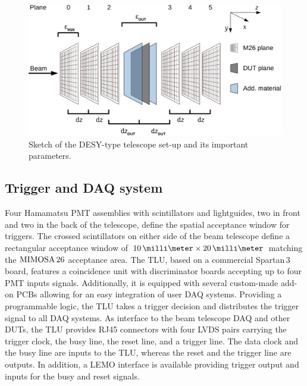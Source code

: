 \begin{figure}[tb]
	\center
	\includegraphics[width=.9\textwidth]{figures/sketch_tscope4}
	\caption[Sketch of the DESY-type telescope set-up]{Sketch of the DESY-type telescope set-up and its important parameters.}
	\label{fig:datura_sketch}
\end{figure}

\subsection{Trigger and DAQ system}

Four Hamamatsu PMT assemblies with scintillators and lightguides, two in front and two in the back of the telescope, define the spatial acceptance window for triggers. 
The crossed scintillators on either side of the beam telescope define a rectangular acceptance window of $10\,\milli\meter \times 20\,\milli\meter$ matching the $\textrm{MIMOSA\,26}$ acceptance area. 
The TLU, based on a commercial Spartan\,3 board, features a coincidence unit with discriminator boards accepting up to four PMT inputs signals. 
Additionally, it is equipped with several custom-made add-on PCBs allowing for an easy integration of user DAQ systems. 
Providing a programmable logic, the TLU  takes a trigger decision and distributes the trigger signal to all DAQ systems.
As interface to the beam telescope DAQ and other DUTs, the TLU provides RJ45 connectors with four LVDS pairs carrying the trigger clock, the busy line, the reset line, and a trigger line. 
The data clock and the busy line are inputs to the TLU, whereas the reset and the trigger line are outputs. In addition, a LEMO interface is available providing trigger output and inputs for the busy and reset signals.

